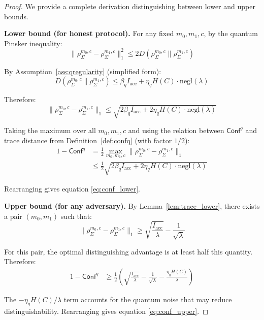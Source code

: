 \documentclass{ieeeaccess}
\newcommand{\Conf}{\mathsf{Conf}}
\begin{document}
\begin{proof}
We provide a complete derivation distinguishing between lower and upper bounds.

\textbf{Lower bound (for honest protocol).} 
For any fixed $m_0, m_1, c$, by the quantum Pinsker inequality:
\begin{equation}
    \|\rho_\Sigma^{m_0,c} - \rho_\Sigma^{m_1,c}\|_1^2 \leq 2 D(\rho_\Sigma^{m_0,c} \| \rho_\Sigma^{m_1,c})
\end{equation}

By Assumption~\ref{ass:qregularity} (simplified form):
\begin{equation}
    D(\rho_\Sigma^{m_0,c} \| \rho_\Sigma^{m_1,c}) \leq \beta_q I_{\mathrm{acc}} + \eta_q H(C) \cdot \mathrm{negl}(\lambda)
\end{equation}

Therefore:
\begin{equation}
    \|\rho_\Sigma^{m_0,c} - \rho_\Sigma^{m_1,c}\|_1 \leq \sqrt{2\beta_q I_{\mathrm{acc}} + 2\eta_q H(C) \cdot \mathrm{negl}(\lambda)}
\end{equation}

Taking the maximum over all $m_0,m_1,c$ and using the relation between $\Conf^q$ and trace distance from Definition~\ref{def:confq} (with factor $1/2$):
\begin{align}
    1 - \Conf^q &= \frac{1}{2} \max_{m_0,m_1,c} \|\rho_\Sigma^{m_0,c} - \rho_\Sigma^{m_1,c}\|_1 \\
    &\leq \frac{1}{2}\sqrt{2\beta_q I_{\mathrm{acc}} + 2\eta_q H(C) \cdot \mathrm{negl}(\lambda)}
\end{align}

Rearranging gives equation \eqref{eq:conf_lower}.

\textbf{Upper bound (for any adversary).}
By Lemma~\ref{lem:trace_lower}, there exists a pair $(m_0,m_1)$ such that:
\begin{equation}
    \|\rho_\Sigma^{m_0,c} - \rho_\Sigma^{m_1,c}\|_1 \geq \sqrt{\frac{I_{\mathrm{acc}}}{\lambda}} - \frac{1}{\sqrt{\lambda}}
\end{equation}

For this pair, the optimal distinguishing advantage is at least half this quantity. Therefore:
\begin{align}
    1 - \Conf^q &\geq \frac{1}{2}\left(\sqrt{\frac{I_{\mathrm{acc}}}{\lambda}} - \frac{1}{\sqrt{\lambda}} - \frac{\eta_q H(C)}{\lambda}\right)
\end{align}

The $-\eta_q H(C)/\lambda$ term accounts for the quantum noise that may reduce distinguishability. Rearranging gives equation \eqref{eq:conf_upper}.

\end{proof}
\end{document}
